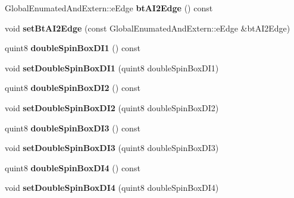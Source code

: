 \begin{DoxyCompactItemize}
Global\+Enumated\+And\+Extern\+::e\+Edge {\bfseries bt\+A\+I2\+Edge} () const
\item 
\mbox{\label{class_trigger_functions_a53a9f7939af108d0dad58d8d380c1867}} 
void {\bfseries set\+Bt\+A\+I2\+Edge} (const Global\+Enumated\+And\+Extern\+::e\+Edge \&bt\+A\+I2\+Edge)
\item 
\mbox{\label{class_trigger_functions_ac24141b80f5ebcb4165f01c05ab1473a}} 
quint8 {\bfseries double\+Spin\+Box\+D\+I1} () const
\item 
\mbox{\label{class_trigger_functions_a7a3870fdec6142ad52b7336c029f836b}} 
void {\bfseries set\+Double\+Spin\+Box\+D\+I1} (quint8 double\+Spin\+Box\+D\+I1)
\item 
\mbox{\label{class_trigger_functions_ac4856cd79f29f3ee0d011cf2ab2b0e26}} 
quint8 {\bfseries double\+Spin\+Box\+D\+I2} () const
\item 
\mbox{\label{class_trigger_functions_a5a52a4753a417b6deaf0052ab9a60594}} 
void {\bfseries set\+Double\+Spin\+Box\+D\+I2} (quint8 double\+Spin\+Box\+D\+I2)
\item 
\mbox{\label{class_trigger_functions_a757895585a0b588e5c0a9a4578ecad34}} 
quint8 {\bfseries double\+Spin\+Box\+D\+I3} () const
\item 
\mbox{\label{class_trigger_functions_adaf3a3639d41be9f5902497f0687c993}} 
void {\bfseries set\+Double\+Spin\+Box\+D\+I3} (quint8 double\+Spin\+Box\+D\+I3)
\item 
\mbox{\label{class_trigger_functions_abde14a4703ef2732b0b82b02ecd66023}} 
quint8 {\bfseries double\+Spin\+Box\+D\+I4} () const
\item 
\mbox{\label{class_trigger_functions_a5a0018cf94072218689e2de184290808}} 
void {\bfseries set\+Double\+Spin\+Box\+D\+I4} (quint8 double\+Spin\+Box\+D\+I4)
\item 
\mbox{\label{class_trigger_functions_aa00d983ef6bb0ab225b334302755ee19}} 

\end{DoxyCompactItemize}
